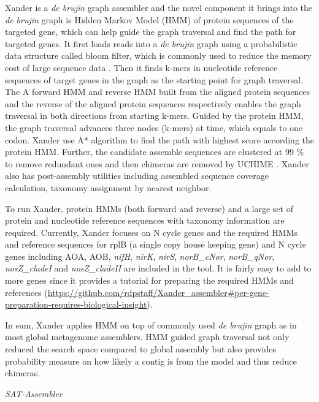\documentclass[]{msu-thesis}
\begin{document}
Xander is a \textit{de brujin} graph assembler and the novel component
it brings into the \textit{de brujin} graph is Hidden Markov Model
(HMM) of protein sequences of the targeted gene, which can help guide
the graph traversal and find the path for targeted genes. It first
loads reads into a \textit{de brujin} graph using a probabilistic data
structure called bloom filter, which is commonly used to reduce the
memory cost of large sequence data \cite{pell_scaling_2012}. Then it
finds k-mers in nucleotide reference sequences of target genes in the
graph as the starting point for graph traversal. The A forward HMM and
reverse HMM built from the aligned protein sequences and the reverse
of the aligned protein sequences respectively enables the graph
traversal in both directions from starting k-mers. Guided by the
protein HMM, the graph traversal advances three nodes (k-mers) at
time, which equals to one codon. Xander use A* algorithm to find the
path with highest score according the protein HMM. Further, the
candidate assemble sequences are clustered at 99 \% to remove
redundant ones and then chimeras are removed by UCHIME
\cite{edgar_uchime_2011}. Xander also has post-assembly utilities
including assembled sequence coverage calculation, taxonomy assignment
by nearest neighbor.

To run Xander, protein HMMs (both forward and reverse) and a large set
of protein and nucleotide reference sequences with taxonomy
information are required. Currently, Xander focuses on N cycle genes
and the required HMMs and reference sequences for rplB (a single copy
house keeping gene) and N cycle genes including AOA, AOB,
\textit{nifH}, \textit{nirK}, \textit{nirS}, \textit{norB\_cNor},
\textit{norB\_qNor}, \textit{nosZ\_cladeI} and \textit{nosZ\_cladeII}
are included in the tool. It is fairly easy to add to more genes since
it provides a tutorial for preparing the required HMMs and references
(\url{https://github.com/rdpstaff/Xander\_assembler\#per-gene-preparation-requires-biological-insight}).

In sum, Xander applies HMM on top of commonly used \textit{de brujin}
graph as in most global metagenome assemblers. HMM guided graph
traversal not only reduced the search space compared to global
assembly but also provides probability measure on how likely a contig
is from the model and thus reduce chimeras.

\textit{SAT-Assembler}
\end{document}
